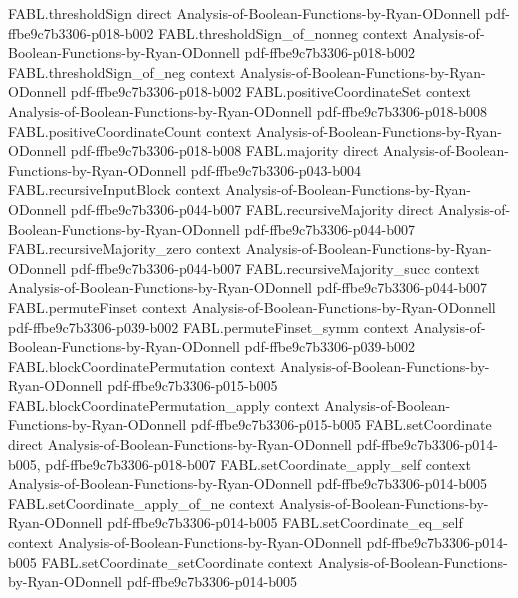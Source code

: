 \begin{theorem}
  {FABL.thresholdSign}
  {direct}
  {Analysis-of-Boolean-Functions-by-Ryan-ODonnell}
  {pdf-ffbe9c7b3306-p018-b002}
\proofstep
  {FABL.thresholdSign_of_nonneg}
  {context}
  {Analysis-of-Boolean-Functions-by-Ryan-ODonnell}
  {pdf-ffbe9c7b3306-p018-b002}
\proofstep
  {FABL.thresholdSign_of_neg}
  {context}
  {Analysis-of-Boolean-Functions-by-Ryan-ODonnell}
  {pdf-ffbe9c7b3306-p018-b002}
\proofstep
  {FABL.positiveCoordinateSet}
  {context}
  {Analysis-of-Boolean-Functions-by-Ryan-ODonnell}
  {pdf-ffbe9c7b3306-p018-b008}
\proofstep
  {FABL.positiveCoordinateCount}
  {context}
  {Analysis-of-Boolean-Functions-by-Ryan-ODonnell}
  {pdf-ffbe9c7b3306-p018-b008}
\proofstep
  {FABL.majority}
  {direct}
  {Analysis-of-Boolean-Functions-by-Ryan-ODonnell}
  {pdf-ffbe9c7b3306-p043-b004}
\proofstep
  {FABL.recursiveInputBlock}
  {context}
  {Analysis-of-Boolean-Functions-by-Ryan-ODonnell}
  {pdf-ffbe9c7b3306-p044-b007}
\proofstep
  {FABL.recursiveMajority}
  {direct}
  {Analysis-of-Boolean-Functions-by-Ryan-ODonnell}
  {pdf-ffbe9c7b3306-p044-b007}
\proofstep
  {FABL.recursiveMajority_zero}
  {context}
  {Analysis-of-Boolean-Functions-by-Ryan-ODonnell}
  {pdf-ffbe9c7b3306-p044-b007}
\proofstep
  {FABL.recursiveMajority_succ}
  {context}
  {Analysis-of-Boolean-Functions-by-Ryan-ODonnell}
  {pdf-ffbe9c7b3306-p044-b007}
\proofstep
  {FABL.permuteFinset}
  {context}
  {Analysis-of-Boolean-Functions-by-Ryan-ODonnell}
  {pdf-ffbe9c7b3306-p039-b002}
\proofstep
  {FABL.permuteFinset_symm}
  {context}
  {Analysis-of-Boolean-Functions-by-Ryan-ODonnell}
  {pdf-ffbe9c7b3306-p039-b002}
\proofstep
  {FABL.blockCoordinatePermutation}
  {context}
  {Analysis-of-Boolean-Functions-by-Ryan-ODonnell}
  {pdf-ffbe9c7b3306-p015-b005}
\proofstep
  {FABL.blockCoordinatePermutation_apply}
  {context}
  {Analysis-of-Boolean-Functions-by-Ryan-ODonnell}
  {pdf-ffbe9c7b3306-p015-b005}
\proofstep
  {FABL.setCoordinate}
  {direct}
  {Analysis-of-Boolean-Functions-by-Ryan-ODonnell}
  {pdf-ffbe9c7b3306-p014-b005,
    pdf-ffbe9c7b3306-p018-b007}
\proofstep
  {FABL.setCoordinate_apply_self}
  {context}
  {Analysis-of-Boolean-Functions-by-Ryan-ODonnell}
  {pdf-ffbe9c7b3306-p014-b005}
\proofstep
  {FABL.setCoordinate_apply_of_ne}
  {context}
  {Analysis-of-Boolean-Functions-by-Ryan-ODonnell}
  {pdf-ffbe9c7b3306-p014-b005}
\proofstep
  {FABL.setCoordinate_eq_self}
  {context}
  {Analysis-of-Boolean-Functions-by-Ryan-ODonnell}
  {pdf-ffbe9c7b3306-p014-b005}
\proofstep
  {FABL.setCoordinate_setCoordinate}
  {context}
  {Analysis-of-Boolean-Functions-by-Ryan-ODonnell}
  {pdf-ffbe9c7b3306-p014-b005}
\proofstep

\end{theorem}
